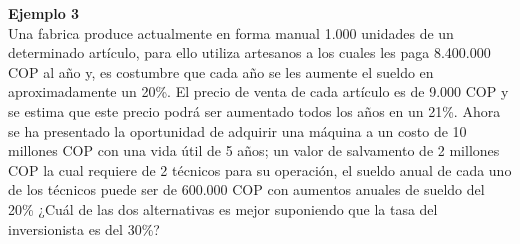 \textbf{Ejemplo 3}\\
Una fabrica produce actualmente en forma manual 1.000 unidades de un determinado artículo, para ello utiliza artesanos a los cuales les paga 8.400.000 COP al año y, es costumbre que cada año se les aumente el sueldo en aproximadamente un 20\%. El precio de venta de cada artículo es de 9.000 COP y se estima que este precio podrá ser aumentado todos los años en un 21\%. Ahora se ha presentado la oportunidad de adquirir una máquina a un costo de 10 millones COP con una vida útil de 5 años; un valor de salvamento de 2 millones COP la cual requiere de 2 técnicos para su operación, el sueldo anual de cada uno de los técnicos puede ser de 600.000 COP con aumentos anuales de sueldo del 20\% ¿Cuál de las dos alternativas es mejor suponiendo que la tasa del inversionista es del 30\%?\\



